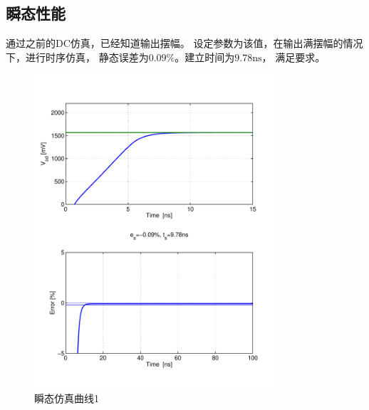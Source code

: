 \documentclass[a4paper]{article}
\newcommand{\uns}{\si{\nano\second}}
\begin{document}
\subsection{瞬态性能}
通过之前的DC仿真，已经知道输出摆幅。
设定参数为该值，在输出满摆幅的情况下，进行时序仿真，
静态误差为$0.09\%$。建立时间为$9.78\uns$，
满足要求。
\begin{figure}[htb]
    \begin{center}
        \includegraphics[width=0.8\textwidth]{common/tran1.pdf}
    \end{center}
    \caption{瞬态仿真曲线1}
    \label{commontran1}
\end{figure}
\end{document}
